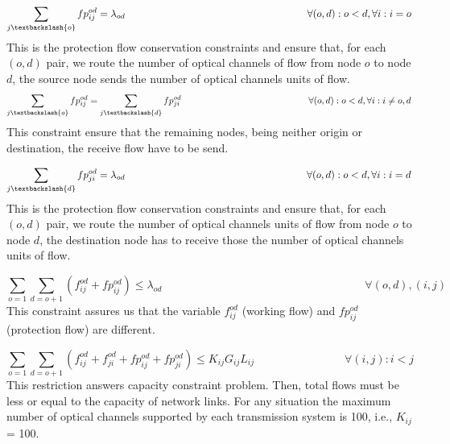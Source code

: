 \begin{equation}
\sum_{j\textbackslash \{o\}} fp_{ij}^{od} = \lambda_{od} \qquad \qquad \qquad \qquad \qquad \qquad \qquad \qquad \qquad
\forall(o,d) : o < d, \forall i: i = o
\label{ILPTransp1p}
\end{equation}
\noindent
This is the protection flow conservation constraints and ensure that, for each $(o,d)$ pair, we route the number of optical channels of flow from node $o$ to node $d$, the source node sends the number of optical channels units of flow.
\newpage
\begin{equation}
\sum_{j\textbackslash \{o\}} fp_{ij}^{od} = \sum_{j\textbackslash \{d\}} fp_{ji}^{od} \qquad \qquad \qquad \qquad \qquad \qquad \qquad
\forall(o,d) : o < d, \forall i: i \neq o,d
\label{ILPTransp2p}
\end{equation}
\noindent
This constraint ensure that the remaining nodes, being neither origin or destination, the receive flow have to be send.

\begin{equation}
\sum_{j\textbackslash \{d\}} fp_{ji}^{od} = \lambda_{od} \qquad \qquad \qquad \qquad \qquad \qquad \qquad \qquad \qquad
\forall(o,d) : o < d, \forall i: i = d
\label{ILPTransp3p}
\end{equation}
\noindent
This is the protection flow conservation constraints and ensure that, for each $(o,d)$ pair, we route the number of optical channels units of flow from node $o$ to node $d$, the destination node has to receive those the number of optical channels units of flow.

\begin{equation}
\sum_{o=1} \sum_{d=o+1} \left(f_{ij}^{od}  + fp_{ij}^{od}\right) \leq \lambda_{od}  \qquad \qquad \qquad \qquad \qquad \qquad \qquad \qquad \qquad
\forall (o,d), (i,j)
\label{ILPTransp4p}
\end{equation}
\noindent
This constraint assures us that the variable $f_{ij}^{od}$ (working flow) and $fp_{ij}^{od}$ (protection flow) are different.

\begin{equation}
\sum_{o=1} \sum_{d=o+1} \left(f_{ij}^{od} + f_{ji}^{od} + fp_{ij}^{od} + fp_{ji}^{od}\right) \leq K_{ij} G_{ij} L_{ij} \qquad \qquad \qquad \qquad
\forall(i,j) : i < j
\label{ILPTransp4}
\end{equation}
\noindent
This restriction answers capacity constraint problem. Then, total flows must be less or equal to the capacity of network links. For any situation the maximum number of optical channels supported by each transmission system is 100, i.e., $K_{ij}$ = 100.

